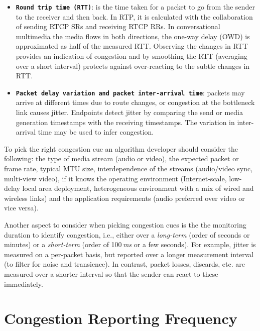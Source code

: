 \begin{itemize}

\item \textbf{\texttt{Round trip time (RTT)}}: is the time taken for a packet
to go from the sender to the receiver and then back. In RTP, it is calculated
with the collaboration of sending RTCP SRs and receiving RTCP RRs. In
conversational multimedia the media flows in both directions, the one-way
delay (OWD) is approximated as half of the measured RTT. Observing the changes
in RTT provides an indication of congestion and by smoothing the RTT
(averaging over a short interval) protects against over-reacting to the subtle
changes in RTT.

\item \textbf{\texttt{Packet delay variation and packet inter-arrival time}}:
packets may arrive at different times due to route changes, or congestion at
the bottleneck link causes jitter. Endpoints detect jitter by comparing the
send or media generation timestamps with the receiving timestamps. The
variation in inter-arrival time may be used to infer congestion.


\end{itemize}

To pick the right congestion cue an algorithm developer should consider the
following: the type of media stream (audio or video), the expected packet or
frame rate, typical MTU size, interdependence of the streams (audio/video
sync, multi-view video), if it knows the operating environment (Internet-scale, 
low-delay local area deployment, heterogeneous environment with a mix
of wired and wireless links) and the application requirements (audio preferred
over video or vice versa).

Another aspect to consider when picking congestion cues is the the monitoring
duration to identify congestion, i.e., either over a \emph{long-term} (order
of seconds or minutes) or a \emph{short-term} (order of 100\,\emph{ms} or a
few seconds). For example, jitter is measured on a per-packet basis, but
reported over a longer measurement interval (to filter for noise and
transience). In contrast, packet losses, discards, etc. are measured over a
shorter interval so that the sender can react to these immediately.

\section{Congestion Reporting Frequency}
\label{fw.freq}


